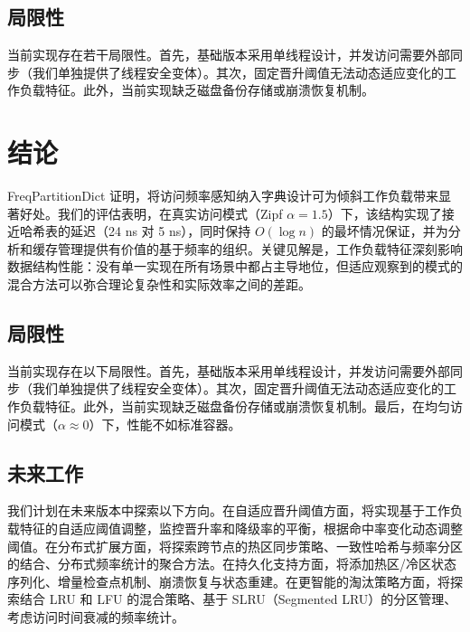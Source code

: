 \documentclass[11pt,a4paper]{article}
\begin{document}
\subsection{局限性}

当前实现存在若干局限性。首先，基础版本采用单线程设计，并发访问需要外部同步（我们单独提供了线程安全变体）。其次，固定晋升阈值无法动态适应变化的工作负载特征。此外，当前实现缺乏磁盘备份存储或崩溃恢复机制。

\section{结论}

FreqPartitionDict 证明，将访问频率感知纳入字典设计可为倾斜工作负载带来显著好处。我们的评估表明，在真实访问模式（Zipf $\alpha = 1.5$）下，该结构实现了接近哈希表的延迟（24 ns 对 5 ns），同时保持 $O(\log n)$ 的最坏情况保证，并为分析和缓存管理提供有价值的基于频率的组织。关键见解是，工作负载特征深刻影响数据结构性能：没有单一实现在所有场景中都占主导地位，但适应观察到的模式的混合方法可以弥合理论复杂性和实际效率之间的差距。

\subsection{局限性}

当前实现存在以下局限性。首先，基础版本采用单线程设计，并发访问需要外部同步（我们单独提供了线程安全变体）。其次，固定晋升阈值无法动态适应变化的工作负载特征。此外，当前实现缺乏磁盘备份存储或崩溃恢复机制。最后，在均匀访问模式（$\alpha \approx 0$）下，性能不如标准容器。

\subsection{未来工作}

我们计划在未来版本中探索以下方向。在自适应晋升阈值方面，将实现基于工作负载特征的自适应阈值调整，监控晋升率和降级率的平衡，根据命中率变化动态调整阈值。在分布式扩展方面，将探索跨节点的热区同步策略、一致性哈希与频率分区的结合、分布式频率统计的聚合方法。在持久化支持方面，将添加热区/冷区状态序列化、增量检查点机制、崩溃恢复与状态重建。在更智能的淘汰策略方面，将探索结合 LRU 和 LFU 的混合策略、基于 SLRU（Segmented LRU）的分区管理、考虑访问时间衰减的频率统计。
\end{document}
